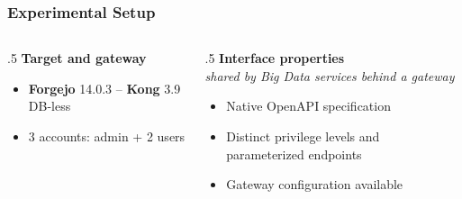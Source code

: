 
\begin{frame}
    \frametitle{Experimental Setup}

    \begin{columns}[T]
        \begin{column}{.5\textwidth}
            \textbf{Target and gateway}
            \begin{itemize}
                \item \textbf{Forgejo} 14.0.3 -- \textbf{Kong} 3.9 DB-less
                \item 3 accounts: admin + 2 users
            \end{itemize}
        \end{column}

        \begin{column}{.5\textwidth}
            \textbf{Interface properties}\\
            {\footnotesize\textit{shared by Big Data services behind a gateway}}
            \begin{itemize}
                \item Native \alert{OpenAPI specification}
                \item Distinct \alert{privilege levels} and parameterized endpoints
                \item \alert{Gateway configuration} available
            \end{itemize}
        \end{column}
    \end{columns}

    \vspace{1.2em}


\end{frame}

